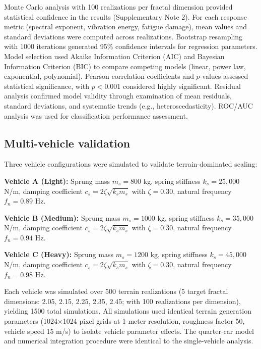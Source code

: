 \documentclass[11pt]{article}
\begin{document}
Monte Carlo analysis with 100 realizations per fractal dimension provided statistical confidence in the results (Supplementary Note 2). For each response metric (spectral exponent, vibration energy, fatigue damage), mean values and standard deviations were computed across realizations. Bootstrap resampling with 1000 iterations generated 95\% confidence intervals for regression parameters\cite{Efron1993}. Model selection used Akaike Information Criterion (AIC) and Bayesian Information Criterion (BIC) to compare competing models (linear, power law, exponential, polynomial). Pearson correlation coefficients and $p$-values assessed statistical significance, with $p < 0.001$ considered highly significant. Residual analysis confirmed model validity through examination of mean residuals, standard deviations, and systematic trends (e.g., heteroscedasticity). ROC/AUC analysis\cite{Fawcett2006} was used for classification performance assessment.

\subsection*{Multi-vehicle validation}

Three vehicle configurations were simulated to validate terrain-dominated scaling:

\textbf{Vehicle A (Light):} Sprung mass $m_s = 800$ kg, spring stiffness $k_s = 25{,}000$ N/m, damping coefficient $c_s = 2\zeta\sqrt{k_s m_s}$ with $\zeta = 0.30$, natural frequency $f_n = 0.89$ Hz.

\textbf{Vehicle B (Medium):} Sprung mass $m_s = 1000$ kg, spring stiffness $k_s = 35{,}000$ N/m, damping coefficient $c_s = 2\zeta\sqrt{k_s m_s}$ with $\zeta = 0.30$, natural frequency $f_n = 0.94$ Hz.

\textbf{Vehicle C (Heavy):} Sprung mass $m_s = 1200$ kg, spring stiffness $k_s = 45{,}000$ N/m, damping coefficient $c_s = 2\zeta\sqrt{k_s m_s}$ with $\zeta = 0.30$, natural frequency $f_n = 0.98$ Hz.


Each vehicle was simulated over 500 terrain realizations (5 target fractal dimensions: 2.05, 2.15, 2.25, 2.35, 2.45; with 100 realizations per dimension), yielding 1500 total simulations. All simulations used identical terrain generation parameters (1024$\times$1024 pixel grids at 1-meter resolution, roughness factor 50, vehicle speed 15 m/s) to isolate vehicle parameter effects. The quarter-car model and numerical integration procedure were identical to the single-vehicle analysis.
\end{document}
